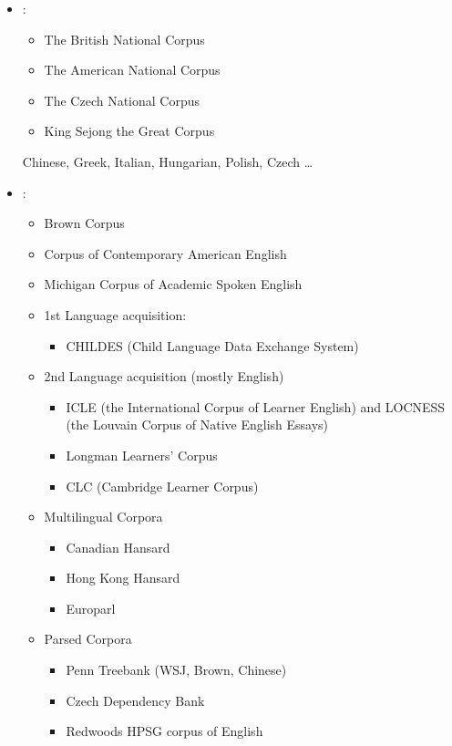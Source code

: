 \documentclass[a4paper,landscape,headrule,footrule,xetex]{foils}
\begin{document}
\begin{itemize}
\item {}:
  \begin{itemize}
  \item The British National Corpus
  \item The American National Corpus
  \item The Czech National Corpus
  \item King Sejong the Great Corpus
  \end{itemize}
  Chinese, Greek, Italian, Hungarian, Polish, Czech \ldots
\item {}:
  \begin{itemize}
  \item Brown Corpus
  \item Corpus of Contemporary American English
  \item  Michigan Corpus of Academic Spoken English
\newpage
  \item  1st Language acquisition:
    \begin{itemize}
    \item  CHILDES (Child Language Data Exchange System)
    \end{itemize}
  \item  2nd Language acquisition (mostly English)
    \begin{itemize}
    \item  ICLE (the International Corpus of Learner English) and LOCNESS (the Louvain Corpus of Native English Essays)
    \item  Longman Learners' Corpus
    \item  CLC (Cambridge Learner Corpus)
    \end{itemize}
  \item Multilingual Corpora
    \begin{itemize}
    \item Canadian Hansard
    \item Hong Kong Hansard
    \item Europarl
    \end{itemize}
  \item Parsed  Corpora
    \begin{itemize}
    \item Penn Treebank (WSJ, Brown, Chinese)
    \item Czech Dependency Bank
    \item Redwoods HPSG corpus of English
    \end{itemize}
\end{itemize}
\end{itemize}
\end{document}

